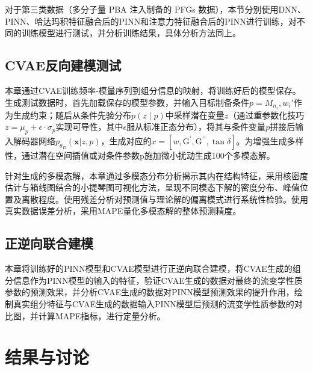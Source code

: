 对于第三类数据（多分子量 PBA 注入制备的 PFGs 数据），本节分别使用DNN、PINN、哈达玛积特征融合后的PINN和注意力特征融合后的PINN进行训练，对不同的训练模型进行测试，并分析训练结果，具体分析方法同上。

\subsection{CVAE反向建模测试}
本章通过CVAE训练频率-模量序列到组分信息的映射，将训练好后的模型保存。生成测试数据时，首先加载保存的模型参数，并输入目标制备条件$p = { M_{n_i}, w_i }'$作为生成约束；随后从条件先验分布$p(z∣p)$中采样潜在变量$z$（通过重参数化技巧$z=\mu_p+\epsilon⋅\sigma_p$实现可导性，其中$\epsilon$服从标准正态分布），将其与条件变量$p$拼接后输入解码器网络$p_{\theta_D}(\mathbf{x}|z,p)$，生成对应的$x = [w, \mathrm{G^{\prime}}, \mathrm{G^{\prime\prime}}, \tan \delta]$。为增强生成多样性，通过潜在空间插值或对条件参数p施加微小扰动生成100个多模态解。

针对生成的多模态解，本章通过多模态分布分析揭示其内在结构特征，采用核密度估计与箱线图结合的小提琴图可视化方法，呈现不同模态下解的密度分布、峰值位置及离散程度。使用残差分析对预测值与理论解的偏离模式进行系统性检验。使用真实数据误差分析，采用MAPE量化多模态解的整体预测精度。

\subsection{正逆向联合建模}
本章将训练好的PINN模型和CVAE模型进行正逆向联合建模，将CVAE生成的组分信息作为PINN模型的输入的特征，验证CVAE生成的数据对最终的流变学性质参数的预测效果，并分析CVAE生成的数据对PINN模型预测效果的提升作用，绘制真实组分特征与CVAE生成的数据输入PINN模型后预测的流变学性质参数的对比图，并计算MAPE指标，进行定量分析。


\section{结果与讨论}
